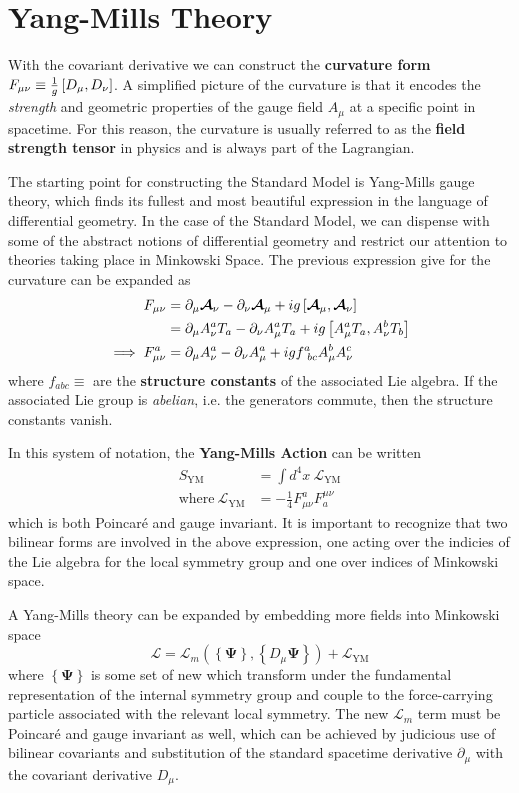 \section{Yang-Mills Theory}
With the covariant derivative we can construct the \textbf{curvature form} $F_{\mu\nu} \equiv \frac{1}{g}  \left[ {D_\mu},{D_\nu} \right] $.
A simplified picture of the curvature is that it encodes the \textit{strength} and geometric properties of the gauge field $A_\mu$ at a specific point in spacetime.
For this reason, the curvature is usually referred to as the \textbf{field strength tensor} in physics and is always part of the Lagrangian.

The starting point for constructing the Standard Model is Yang-Mills gauge theory, which finds its fullest and most beautiful expression in the language of differential geometry.
In the case of the Standard Model, we can dispense with some of the abstract notions of differential geometry and restrict our attention to theories taking place in Minkowski Space.
The previous expression give for the curvature can be expanded as
\begin{align}
    F_{\mu\nu} &= \partial_\mu  \boldsymbol{\mathcal{A}} _\nu - \partial_\nu  \boldsymbol{\mathcal{A}} _\mu + ig \left[ { \boldsymbol{\mathcal{A}} _\mu},{ \boldsymbol{\mathcal{A}} _\nu} \right] \\
    &= \partial_\mu A_\nu^aT_a - \partial_\nu A_\mu^aT_a + ig \left[ {A_\mu^aT_a},{A_\nu^bT_b} \right] \\
    \implies F_{\mu\nu}^a &= \partial_\mu A_\nu^a - \partial_\nu A_\mu^a + igf^a_{\ bc}A_\mu^bA_\nu^c
\end{align}
where $f_{abc} \equiv $ are the \textbf{structure constants} of the associated Lie algebra.
If the associated Lie group is \textit{abelian}, i.e. the generators commute, then the structure constants vanish.

In this system of notation, the \textbf{Yang-Mills Action} can be written
\newcommand{\YML}{ \ensuremath{ \mathcal{L}_{\mathrm{YM}} } }
\begin{align}
    S_{\mathrm{YM}} &= \int d^4x\ \YML\\
    \mathrm{where}\ \YML &= -\frac{1}{4} F_{\mu\nu}^a F^{\mu\nu}_a
\end{align}
which is both Poincar\'{e} and gauge invariant. It is important to recognize that two bilinear forms are involved in the above expression, one acting over the indicies of the Lie algebra for the local symmetry group and one over indices of Minkowski space.

A Yang-Mills theory can be expanded by embedding more fields into Minkowski space
\newcommand{\YM}{ \ensuremath{ \mathcal{L}_m\left( \left\{ \boldsymbol\Psi \right\}, \left\{ D_\mu \boldsymbol\Psi \right\} \right) }}
\begin{equation}
    \mathcal{L} = \YM + \YML
\end{equation}
where $\left\{ \boldsymbol\Psi \right\}$ is some set of new which transform under the fundamental representation of the internal symmetry group and couple to the force-carrying particle associated with the relevant local symmetry.
The new $\mathcal{L}_m$ term must be Poincar\'{e} and gauge invariant as well, which can be achieved by judicious use of bilinear covariants and substitution of the standard spacetime derivative $\partial_\mu$ with the covariant derivative $D_\mu$.

